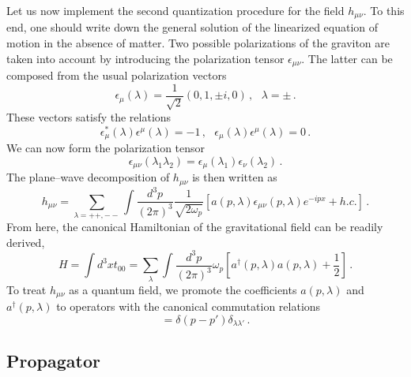 \documentclass[12pt]{article}
\begin{document}
Let us now implement the second quantization procedure for the field $h_{\mu\nu}$. To this end, one should write down the general solution of the linearized equation of motion in the absence of matter. Two possible polarizations of the graviton are taken into account by introducing the polarization tensor $\epsilon_{\mu\nu}$. The latter can be composed from the usual polarization vectors
\begin{equation}
\epsilon_\mu(\lambda)=\dfrac{1}{\sqrt{2}}(0,1,\pm i, 0) \,,~~~\lambda=\pm \,.
\end{equation}
These vectors satisfy the relations
\begin{equation}
\epsilon^*_\mu(\lambda)\epsilon^\mu(\lambda)=-1 \,,~~~\epsilon_\mu(\lambda)\epsilon^\mu(\lambda)=0 \,.
\end{equation}
We can now form the polarization tensor
\begin{equation}
\epsilon_{\mu\nu}(\lambda_1\lambda_2)=\epsilon_\mu(\lambda_1)\epsilon_\nu(\lambda_2) \,.
\end{equation}
The plane--wave decomposition of $h_{\mu\nu}$ is then written as
\begin{equation}
 h_{\mu\nu}=\sum_{\lambda=++,--}\int\dfrac{d^3p}{(2\pi)^3}\dfrac{1}{\sqrt{2\omega_p}}\left[a(p,\lambda)\epsilon_{\mu\nu}(p,\lambda)e^{-ipx}+h.c.\right] \,.
\end{equation}
From here, the canonical Hamiltonian of the gravitational field can be readily derived,
\begin{equation}
H=\int d^3x t_{00}=\sum_{\lambda}\int\dfrac{d^3p}{(2\pi)^3}\omega_p\left[a^\dag(p,\lambda)a(p,\lambda)+\dfrac{1}{2}\right] \,.
\end{equation}
To treat $h_{\mu\nu}$ as a quantum field, we promote the coefficients $a(p,\lambda)$ and $a^\dag(p,\lambda)$ to operators with the canonical commutation relations
\begin{equation}
[a(p,\lambda),a^\dag(p',\lambda')]=\delta(p-p')\delta_{\lambda\lambda'} \,.
\end{equation}

\subsection{Propagator}
\end{document}
